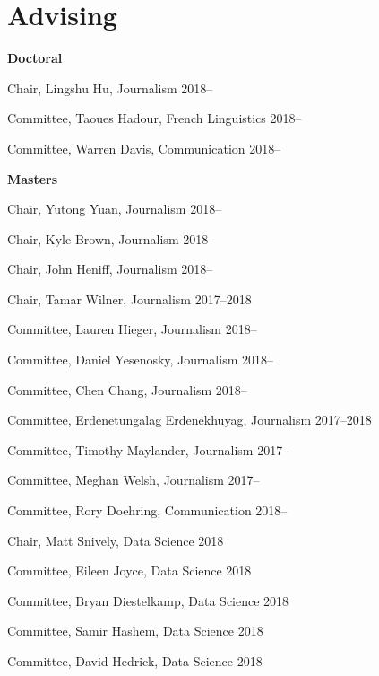 
\section{Advising}

  \textbf{Doctoral}
    \begin{innerlist}
      \item Chair, Lingshu Hu, Journalism                            \hfill 2018--
      \item Committee, Taoues Hadour, French Linguistics             \hfill 2018--
      \item Committee, Warren Davis, Communication                   \hfill 2018--
    \end{innerlist}\vspace{1em}

  \textbf{Masters}
    \begin{innerlist}
      \item Chair, Yutong Yuan, Journalism                           \hfill 2018--
      \item Chair, Kyle Brown, Journalism                            \hfill 2018--
      \item Chair, John Heniff, Journalism                           \hfill 2018--
      \item Chair, Tamar Wilner, Journalism                          \hfill 2017--2018
      \item Committee, Lauren Hieger, Journalism                     \hfill 2018--
      \item Committee, Daniel Yesenosky, Journalism                  \hfill 2018--
      \item Committee, Chen Chang, Journalism                        \hfill 2018--
      \item Committee, Erdenetungalag Erdenekhuyag, Journalism       \hfill 2017--2018
      \item Committee, Timothy Maylander, Journalism                 \hfill 2017--
      \item Committee, Meghan Welsh, Journalism                      \hfill 2017--
      \item Committee, Rory Doehring, Communication                  \hfill 2018--
      \item Chair, Matt Snively, Data Science                        \hfill 2018
      \item Committee, Eileen Joyce, Data Science                    \hfill 2018
      \item Committee, Bryan Diestelkamp, Data Science               \hfill 2018
      \item Committee, Samir Hashem, Data Science                    \hfill 2018
      \item Committee, David Hedrick, Data Science                   \hfill 2018
    \end{innerlist}\vspace{-.1in}

